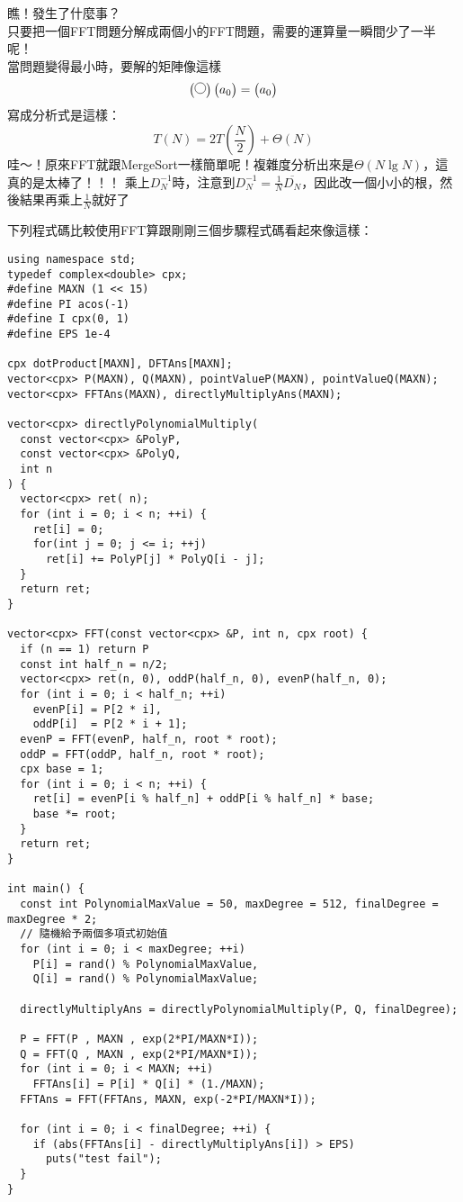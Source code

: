 瞧！發生了什麼事？\\
只要把一個FFT問題分解成兩個小的FFT問題，需要的運算量一瞬間少了一半呢！\\
當問題變得最小時，要解的矩陣像這樣
\[
\begin{pmatrix}    
\pie{0} \\   
\end{pmatrix}
\begin{pmatrix}    
a_0\\
\end{pmatrix}
=
\begin{pmatrix}    
a_0\\
\end{pmatrix}
\]
寫成分析式是這樣：
$$T(N)=2T(\frac N 2)+\Theta(N)$$
哇～！原來FFT就跟MergeSort一樣簡單呢！複雜度分析出來是$\Theta(N\lg N)$，這真的是太棒了！！！
乘上$D_N^{-1}$時，注意到$D_N^{-1}=\frac{1}{N} \overline{D_N}$，因此改一個小小的根，然後結果再乘上$\frac{1}{N}$就好了

下列程式碼比較使用FFT算跟剛剛三個步驟程式碼看起來像這樣：
\begin{lstlisting}[caption=FFT:快速乘DFT矩陣的實現]
using namespace std;
typedef complex<double> cpx;
#define MAXN (1 << 15)
#define PI acos(-1)
#define I cpx(0, 1)
#define EPS 1e-4

cpx dotProduct[MAXN], DFTAns[MAXN];
vector<cpx> P(MAXN), Q(MAXN), pointValueP(MAXN), pointValueQ(MAXN);
vector<cpx> FFTAns(MAXN), directlyMultiplyAns(MAXN);

vector<cpx> directlyPolynomialMultiply(
  const vector<cpx> &PolyP,
  const vector<cpx> &PolyQ,
  int n
) {
  vector<cpx> ret( n);
  for (int i = 0; i < n; ++i) {
    ret[i] = 0;
    for(int j = 0; j <= i; ++j)
      ret[i] += PolyP[j] * PolyQ[i - j];
  }
  return ret;
}

vector<cpx> FFT(const vector<cpx> &P, int n, cpx root) {
  if (n == 1) return P
  const int half_n = n/2;
  vector<cpx> ret(n, 0), oddP(half_n, 0), evenP(half_n, 0);
  for (int i = 0; i < half_n; ++i)
    evenP[i] = P[2 * i],
    oddP[i]  = P[2 * i + 1];
  evenP = FFT(evenP, half_n, root * root);
  oddP = FFT(oddP, half_n, root * root);
  cpx base = 1;
  for (int i = 0; i < n; ++i) {
    ret[i] = evenP[i % half_n] + oddP[i % half_n] * base;
    base *= root;
  }
  return ret;
}

int main() {
  const int PolynomialMaxValue = 50, maxDegree = 512, finalDegree = maxDegree * 2;
  // 隨機給予兩個多項式初始值
  for (int i = 0; i < maxDegree; ++i)
    P[i] = rand() % PolynomialMaxValue,
    Q[i] = rand() % PolynomialMaxValue;

  directlyMultiplyAns = directlyPolynomialMultiply(P, Q, finalDegree);

  P = FFT(P , MAXN , exp(2*PI/MAXN*I));
  Q = FFT(Q , MAXN , exp(2*PI/MAXN*I));
  for (int i = 0; i < MAXN; ++i)
    FFTAns[i] = P[i] * Q[i] * (1./MAXN);
  FFTAns = FFT(FFTAns, MAXN, exp(-2*PI/MAXN*I));

  for (int i = 0; i < finalDegree; ++i) {
    if (abs(FFTAns[i] - directlyMultiplyAns[i]) > EPS)
      puts("test fail");
  }
}
\end{lstlisting}

